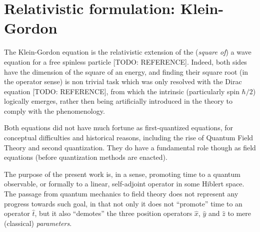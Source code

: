 \section{Relativistic formulation: Klein-Gordon}

The Klein-Gordon equation is the relativistic extension of the
(\emph{square of}) a wave equation for a free spinless particle
[TODO: REFERENCE]. Indeed, both sides have the dimension of
the square of an energy, and finding their square root
(in the operator sense) is non trivial task which was only resolved 
with the Dirac equation [TODO: REFERENCE], from which the
intrinsic  (particularly spin $\hbar/2$) logically emerges,
rather then being artificially introduced in the theory
to comply with the phenomenology.

Both equations did not have much fortune as first-quantized equations,
for conceptual difficulties and historical reasons, including the rise
of Quantum Field Theory and second quantization. They do have a fundamental
role though as field equations (before quantization methods are enacted).

The purpose of the present work is, in a sense, promoting time to a quantum
observable, or formally to a linear, self-adjoint operator in some Hiblert space.
The passage from quantum mechanics to field theory does not represent any progress
towards such goal, in that not only it does not ``promote'' time to an operator $\hat{t}$,
but it also ``demotes'' the three position operators $\hat{x}$, $\hat{y}$ and $\hat{z}$
to mere (classical) \emph{parameters}. 